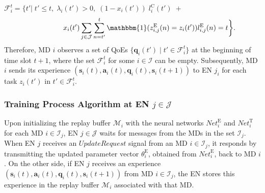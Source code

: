 \documentclass[10pt, journal,letterpaper]{IEEEtran}
\begin{document}
$\mathcal{F}_i^t =\bigg \{ t' \bigg|\; t' \leq t,\; \lambda_i(t')>0, \; (1 - x_i(t')) \; l_i^{\text{C}}(t') \; + $ \vspace{-3mm}
\begin{equation}
	\hspace{17mm} x_i(t')\sum\limits_{j \in \mathcal{J}} \sum\limits_{n= t'}^{t}\mathbbm{1}(z_{i,j}^{\text{E}}(n)=z_i(t'))   l_{i,j}^{\text{E}}(n) = t \bigg\}.
	\label{28}  
	\nonumber
\end{equation}
Therefore, MD $i$ observes a set of QoEs $\{\boldsymbol{q}_i(t') \mid t' \in \mathcal{F}_i^t\}$ at the beginning of time slot $t+1$, where the set $\mathcal{F}_i^t$ for some $i \in \mathcal{I}$ can be empty. Subsequently, MD $i$ sends its experience $(\boldsymbol{s}_i(t), \boldsymbol{a}_i(t), \boldsymbol{q}_i(t), \boldsymbol{s}_i(t+1))$ to EN $j_i$ for each task $z_i(t')$ in $t' \in \mathcal{F}_i^t$.





\subsubsection{Training Process Algorithm at EN $j \in \mathcal{J}$}
Upon initializing the replay buffer $\mathcal{M}_i$ with the neural networks $\textit{Net}_i^{\text{E}}$ and $\textit{Net}_i^{\text{T}}$ for each MD $i \in \mathcal{I}_j$, EN $j \in \mathcal{J}$ waits for messages from the MDs in the set $\mathcal{I}_j$. When EN $j$ receives an $\textit{UpdateRequest}$ signal from an MD $i \in \mathcal{I}_j$, it responds by transmitting the updated parameter vector $\theta^{\text{E}}_i$, obtained from $\textit{Net}_i^{\text{E}}$, back to MD $i$. On the other side, if EN $j$ receives an experience $(\boldsymbol{s}_i(t), \boldsymbol{a}_i(t), \boldsymbol{q}_i(t), \boldsymbol{s}_i(t+1))$ from MD $i \in \mathcal{I}_j$, the EN stores this experience in the replay buffer $\mathcal{M}_i$ associated with that MD. %
\end{document}
